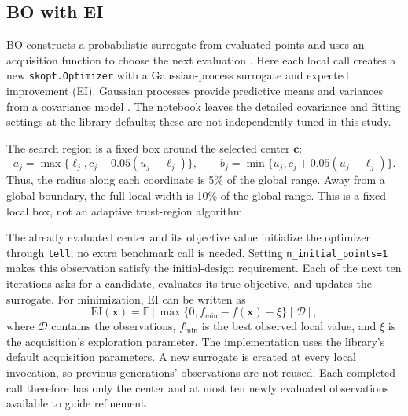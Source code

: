 \subsection{BO with EI}

BO constructs a probabilistic surrogate from evaluated points and uses an acquisition function to choose the next evaluation \cite{frazier2018tutorial}. Here each local call creates a new \texttt{skopt.Optimizer} with a Gaussian-process surrogate and expected improvement (EI). Gaussian processes provide predictive means and variances from a covariance model \cite{rasmussen2006gp}. The notebook leaves the detailed covariance and fitting settings at the library defaults; these are not independently tuned in this study.

The search region is a fixed box around the selected center $\mathbf{c}$:
\begin{equation}
 a_j=\max\{\ell_j,c_j-0.05(u_j-\ell_j)\},\qquad
 b_j=\min\{u_j,c_j+0.05(u_j-\ell_j)\}.
\end{equation}
Thus, the radius along each coordinate is 5\% of the global range. Away from a global boundary, the full local width is 10\% of the global range. This is a fixed local box, not an adaptive trust-region algorithm.

The already evaluated center and its objective value initialize the optimizer through \texttt{tell}; no extra benchmark call is needed. Setting \texttt{n\_initial\_points=1} makes this observation satisfy the initial-design requirement. Each of the next ten iterations asks for a candidate, evaluates its true objective, and updates the surrogate. For minimization, EI can be written as
\begin{equation}
 \mathrm{EI}(\mathbf{x})=\mathbb{E}\!\left[\max\{0,f_{\min}-f(\mathbf{x})-\xi\}\mid\mathcal{D}\right],
\end{equation}
where $\mathcal{D}$ contains the observations, $f_{\min}$ is the best observed local value, and $\xi$ is the acquisition's exploration parameter. The implementation uses the library's default acquisition parameters. A new surrogate is created at every local invocation, so previous generations' observations are not reused. Each completed call therefore has only the center and at most ten newly evaluated observations available to guide refinement.

